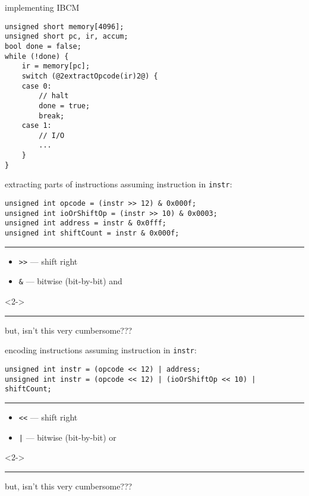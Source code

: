 \begin{frame}[fragile,label=implOutline]{implementing IBCM}
\begin{lstlisting}
unsigned short memory[4096];
unsigned short pc, ir, accum;
bool done = false;
while (!done) {
    ir = memory[pc];
    switch (@2extractOpcode(ir)2@) {
    case 0:
        // halt
        done = true;
        break;
    case 1:
        // I/O
        ...
    }
}
\end{lstlisting}
\end{frame}

\begin{frame}[fragile,label=extractOp]{extracting parts of instructions}
assuming instruction in \texttt{instr}:
\begin{lstlisting}
unsigned int opcode = (instr >> 12) & 0x000f;
unsigned int ioOrShiftOp = (instr >> 10) & 0x0003;
unsigned int address = instr & 0x0fff;
unsigned int shiftCount = instr & 0x000f;
\end{lstlisting}
\hrule
\begin{itemize}
\item \lstinline|>>| --- shift right
\item \lstinline|&| --- bitwise (bit-by-bit) and
\end{itemize}
\begin{visibleenv}<2->
\hrule
but, isn't this very cumbersome???
\end{visibleenv}
\end{frame}

\begin{frame}[fragile,label=encodeOp]{encoding instructions}
assuming instruction in \texttt{instr}:
\begin{lstlisting}
unsigned int instr = (opcode << 12) | address;
unsigned int instr = (opcode << 12) | (ioOrShiftOp << 10) | shiftCount;
\end{lstlisting}
\hrule
\begin{itemize}
\item \lstinline|<<| --- shift right
\item \lstinline^|^ --- bitwise (bit-by-bit) or
\end{itemize}
\begin{visibleenv}<2->
\hrule
but, isn't this very cumbersome???
\end{visibleenv}
\end{frame}

